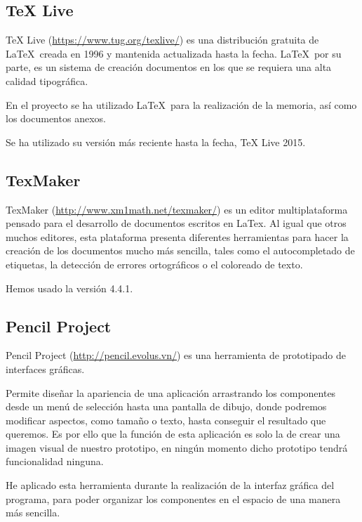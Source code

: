 \subsection{TeX Live}
TeX Live (\url{https://www.tug.org/texlive/}) es una distribución gratuita de \LaTeX\ creada en 1996 y mantenida actualizada hasta la fecha. \LaTeX\, por su parte, es un sistema de creación documentos en los que se requiera una alta calidad tipográfica.

En el proyecto se ha utilizado \LaTeX\ para la realización de la memoria, así como los documentos anexos.

Se ha utilizado su versión más reciente hasta la fecha, TeX Live 2015.

\subsection{TexMaker}

TexMaker (\url{http://www.xm1math.net/texmaker/}) es un editor multiplataforma pensado para el desarrollo de documentos escritos en LaTex. Al igual que otros muchos editores, esta plataforma presenta diferentes herramientas para hacer la creación de los documentos mucho más sencilla, tales como el autocompletado de etiquetas, la detección de errores ortográficos o el coloreado de texto.

Hemos usado la versión 4.4.1.

\subsection{Pencil Project}

Pencil Project (\url{http://pencil.evolus.vn/}) es una herramienta de prototipado de interfaces gráficas.

Permite diseñar la apariencia de una aplicación arrastrando los componentes desde un menú de selección hasta una pantalla de dibujo, donde podremos modificar aspectos, como tamaño o texto, hasta conseguir el resultado que queremos. Es por ello que la función de esta aplicación es solo la de crear una imagen visual de nuestro prototipo, en ningún momento dicho prototipo tendrá funcionalidad ninguna.

He aplicado esta herramienta durante la realización de la interfaz gráfica del programa, para poder organizar los componentes en el espacio de una manera más sencilla.

